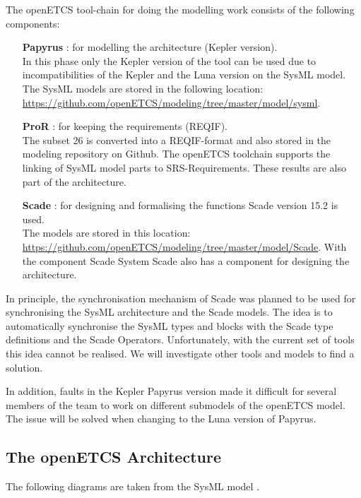 \documentclass{template/openetcs_article}
\begin{document}
The openETCS tool-chain for doing the modelling work consists of the following components:
\begin{itemize}
	\item [\textbf{Papyrus}]: for modelling the architecture (Kepler version).\\
	In this phase only the Kepler version of the tool can be used due to incompatibilities of the Kepler and the Luna version on the SysML model. The SysML models are stored in the following location: \url{https://github.com/openETCS/modeling/tree/master/model/sysml}.
	\item [\textbf{ProR}]: for keeping the requirements (REQIF).\\
	The subset 26 is converted into a REQIF-format and also stored in the modeling repository on Github. The openETCS toolchain supports the linking of SysML model parts to SRS-Requirements. These results are also part of the architecture.
	\item [\textbf{Scade}]: for designing and formalising the functions Scade version 15.2 is used.\\
	The models are stored in this location: \url{https://github.com/openETCS/modeling/tree/master/model/Scade}.
	With the component Scade System Scade also has a component for designing the architecture.
\end{itemize}

In principle, the synchronisation mechanism of Scade was planned to be used for synchronising the SysML architecture and the Scade models. The idea is to automatically synchronise the SysML types and blocks with the Scade type definitions and the Scade Operators. Unfortunately, with the current set of tools this idea cannot be realised. We will investigate other tools and models to find a solution. 

In addition, faults in the Kepler Papyrus version made it difficult for several members of the team to work on different submodels of the openETCS model. The issue will be solved when changing to the Luna version of Papyrus.



\subsection{The openETCS Architecture}

The following diagrams are taken from the SysML model \cite{sysml-model}.
\end{document}
